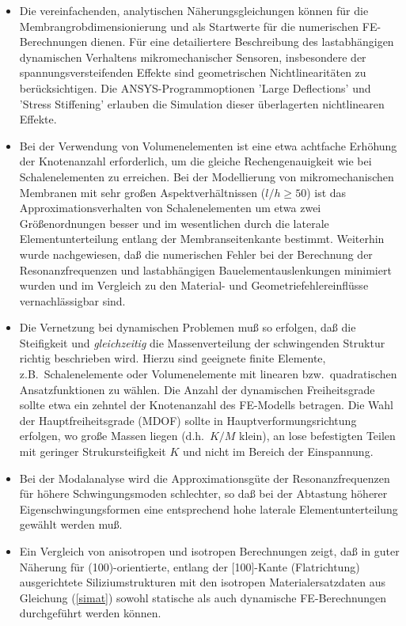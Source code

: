 \begin{itemize}
\item
Die vereinfachenden, analytischen Näherungsgleichungen können für die
Membrangrobdimensionierung und als Startwerte für die numerischen
FE-Berechnungen dienen. Für eine detailiertere Beschreibung des
lastabhängigen dynamischen Verhaltens mikromechanischer Sensoren,
insbesondere der spannungsversteifenden Effekte sind geometrischen
Nichtlinearitäten zu berücksichtigen. Die {\sf ANSYS}-Programmoptionen
'Large Deflections' und 'Stress Stiffening' erlauben die Simulation
dieser überlagerten nichtlinearen Effekte.
\item
Bei der Verwendung von Volumenelementen ist eine etwa achtfache Erhöhung der
Knotenanzahl erforderlich, um die gleiche Rechengenauigkeit wie bei
Schalenelementen zu erreichen. Bei der Modellierung von mikromechanischen
Membranen mit sehr großen Aspektverhältnissen ($l/h \geq 50$) ist das
Approximationsverhalten von Schalenelementen um etwa zwei Größenordnungen
besser und im wesentlichen durch die laterale Elementunterteilung
entlang der Membranseitenkante bestimmt. Weiterhin wurde nachgewiesen, daß
die numerischen Fehler bei der Berechnung der Resonanzfrequenzen und
lastabhängigen Bauelementauslenkungen minimiert wurden und im Vergleich
zu den Material- und Geometriefehlereinflüsse vernachlässigbar sind.
\item
Die Vernetzung bei dynamischen Problemen muß so erfolgen, daß die
Steifigkeit und {\em gleichzeitig} die Massenverteilung der schwingenden
Struktur richtig beschrieben wird. Hierzu sind geeignete finite Elemente,
z.B.\ Schalenelemente oder Volumenelemente mit linearen bzw.\
quadratischen Ansatzfunktionen zu wählen. Die Anzahl der dynamischen
Freiheitsgrade sollte etwa ein zehntel der Knotenanzahl des FE-Modells
betragen.
Die Wahl der Hauptfreiheitsgrade (MDOF) sollte in Hauptverformungsrichtung
erfolgen, wo große Massen liegen (d.h.\ $K/M$ klein), an lose befestigten
Teilen mit geringer Strukursteifigkeit $K$ und nicht im Bereich der
Einspannung.
\item
Bei der Modalanalyse wird die Approximationsgüte der Resonanzfrequenzen
für höhere Schwingungsmoden schlechter, so daß bei der Abtastung höherer
Eigenschwingungsformen eine entsprechend hohe laterale
Elementunterteilung gewählt werden muß.
\item
Ein Vergleich von anisotropen und isotropen Berechnungen zeigt, daß in
guter Näherung für (100)-orientierte, entlang der [100]-Kante (Flatrichtung)
ausgerichtete Siliziumstrukturen mit den isotropen Materialersatzdaten aus
Gleichung (\ref{simat}) sowohl statische als auch dynamische FE-Berechnungen
durchgeführt werden können.
\end{itemize}


